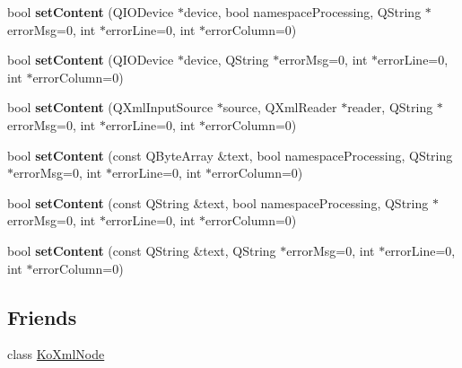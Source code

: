 \begin{DoxyCompactItemize}
\item 
\hypertarget{classKoXmlDocument_ae9f84dc9b1ae3cd561628fbcb4b0d0e5}{
bool {\bfseries setContent} (QIODevice $\ast$device, bool namespaceProcessing, QString $\ast$errorMsg=0, int $\ast$errorLine=0, int $\ast$errorColumn=0)}
\label{classKoXmlDocument_ae9f84dc9b1ae3cd561628fbcb4b0d0e5}

\item 
\hypertarget{classKoXmlDocument_ae14a8ad6b1c2d80acd8416900c1e04d7}{
bool {\bfseries setContent} (QIODevice $\ast$device, QString $\ast$errorMsg=0, int $\ast$errorLine=0, int $\ast$errorColumn=0)}
\label{classKoXmlDocument_ae14a8ad6b1c2d80acd8416900c1e04d7}

\item 
\hypertarget{classKoXmlDocument_a9985cf50d73165c1de6140d1bcec48ff}{
bool {\bfseries setContent} (QXmlInputSource $\ast$source, QXmlReader $\ast$reader, QString $\ast$errorMsg=0, int $\ast$errorLine=0, int $\ast$errorColumn=0)}
\label{classKoXmlDocument_a9985cf50d73165c1de6140d1bcec48ff}

\item 
\hypertarget{classKoXmlDocument_a95a6f5727a5b9b494c3c6cf071b41c9c}{
bool {\bfseries setContent} (const QByteArray \&text, bool namespaceProcessing, QString $\ast$errorMsg=0, int $\ast$errorLine=0, int $\ast$errorColumn=0)}
\label{classKoXmlDocument_a95a6f5727a5b9b494c3c6cf071b41c9c}

\item 
\hypertarget{classKoXmlDocument_a1a35de2b10068b15f7db3f35a9e78768}{
bool {\bfseries setContent} (const QString \&text, bool namespaceProcessing, QString $\ast$errorMsg=0, int $\ast$errorLine=0, int $\ast$errorColumn=0)}
\label{classKoXmlDocument_a1a35de2b10068b15f7db3f35a9e78768}

\item 
\hypertarget{classKoXmlDocument_a45df03a6aac81990c5ad19975126f5b3}{
bool {\bfseries setContent} (const QString \&text, QString $\ast$errorMsg=0, int $\ast$errorLine=0, int $\ast$errorColumn=0)}
\label{classKoXmlDocument_a45df03a6aac81990c5ad19975126f5b3}

\end{DoxyCompactItemize}
\subsection*{Friends}
\begin{DoxyCompactItemize}
\item 
\hypertarget{classKoXmlDocument_a6c97883f92c7cbf2ecdf17db6cea8297}{
class \hyperlink{classKoXmlDocument_a6c97883f92c7cbf2ecdf17db6cea8297}{KoXmlNode}}
\label{classKoXmlDocument_a6c97883f92c7cbf2ecdf17db6cea8297}

\end{DoxyCompactItemize}


